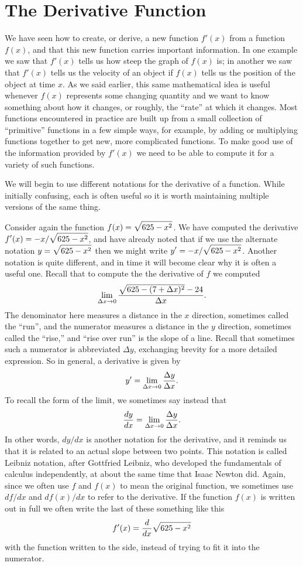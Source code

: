 \section{The Derivative Function}{}{}

We have seen how to create, or derive, a new function $f'(x)$ from a
function $f(x)$, and that this new function carries important
information. In one example we saw that $f'(x)$ tells us how steep the
graph of $f(x)$ is; in another we saw that $f'(x)$ tells us the velocity
of an object if $f(x)$ tells us the  position of the object at time
$x$. As we said earlier, this same mathematical idea is useful
whenever $f(x)$ represents some changing quantity and we want to know
something about how it changes, or roughly, the ``rate'' at which it
changes. Most functions encountered in practice are built up from a
small collection of ``primitive'' functions in a few simple ways, for
example, by adding or multiplying functions together to get new, more
complicated functions. To make good use of the information provided by
$f'(x)$ we need to be able to compute it for a variety of such functions.

We will begin to use different notations for the derivative of a
function. While initially confusing, each is often useful so it is
worth maintaining multiple versions of the same thing.

Consider again the function $\displaystyle f(x)=\sqrt{625-x^2}$.
We have computed the derivative $\displaystyle f'(x)=-x/\sqrt{625-x^2}$, and have
already noted that if we use the alternate notation
$\displaystyle y=\sqrt{625-x^2}$ then we might write $\displaystyle y'=-x/\sqrt{625-x^2}$.
Another notation is quite different, and in time it will become clear
why it is often a useful one. Recall that to compute the the
derivative of $f$ we computed 
$$
\lim_{\Delta x\to0} {\sqrt{625-(7+\Delta x)^2} - 24\over \Delta x}.
$$
The denominator here measures a distance in the $x$ direction,
sometimes called the ``run'', and the numerator measures a distance in
the $y$ direction, sometimes called the ``rise,'' and ``rise over
run'' is the slope of a line. Recall that sometimes such a numerator is
abbreviated $\Delta y$, exchanging brevity for a more detailed
expression. So in general, a derivative is given by
$$
y'=\lim_{\Delta x\to0} {\Delta y\over \Delta x}.
$$
To recall the form of the limit, we sometimes say instead that
$$
{dy\over dx}=\lim_{\Delta x\to0} {\Delta y\over \Delta x}.
$$ In other words, $dy/dx$ is another notation for the derivative, and
it reminds us that it is related to an actual slope between two
points. This notation is called {\dfont Leibniz
notation\/}, 
after Gottfried Leibniz, who developed the fundamentals
of calculus independently, at about the same time that Isaac Newton
did.  Again, since we often use $f$ and $f(x)$ to mean the original
function, we sometimes use $df/dx$ and $df(x)/dx$ to refer to the
derivative. If the function $f(x)$ is written out in full we often
write the last of these something like this
$$f'(x)={d\over dx}\sqrt{625-x^2}
$$
with the function written to the side, instead of trying to fit it into
the numerator.

